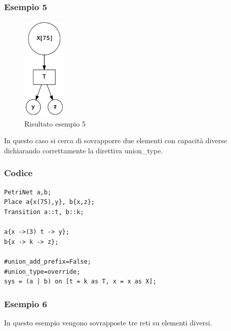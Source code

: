\documentclass[italian,12pt]{book}
\begin{document}
\subsubsection{Esempio 5}
\begin{figure}[htb]
\centerline{\includegraphics[height=5cm]{img/unione_004.png}}
\caption{Risultato esempio 5}\label{fig:unione_004.png}
\end{figure}
In questo caso si cerca di sovrapporre due elementi con capacità diverse
dichiarando correttamente la direttiva union\_type.\\
\subsubsection{Codice}
\begin{verbatim}
PetriNet a,b;
Place a{x(75),y}, b{x,z};
Transition a::t, b::k;

a{x ->(3) t -> y};
b{x -> k -> z};

#union_add_prefix=False;
#union_type=override;
sys = (a | b) on [t = k as T, x = x as X];
\end{verbatim}

\subsubsection{Esempio 6}

In questo esempio vengono sovrapposte tre reti su elementi diversi.\\
\end{document}
